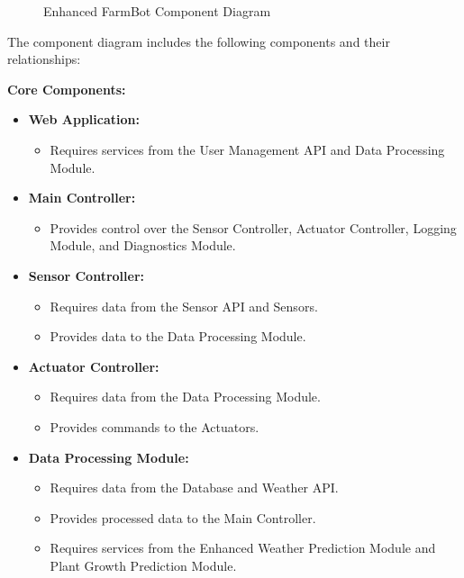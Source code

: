 \begin{figure}[H]
    \centering
    
    \caption{Enhanced FarmBot Component Diagram}
\end{figure}

The component diagram includes the following components and their relationships:

\textbf{Core Components:}
\begin{itemize}
    \item \textbf{Web Application:}
    \begin{itemize}
        \item Requires services from the User Management API and Data Processing Module.
    \end{itemize}

    \item \textbf{Main Controller:}
    \begin{itemize}
        \item Provides control over the Sensor Controller, Actuator Controller, Logging Module, and Diagnostics Module.
    \end{itemize}

    \item \textbf{Sensor Controller:}
    \begin{itemize}
        \item Requires data from the Sensor API and Sensors.
        \item Provides data to the Data Processing Module.
    \end{itemize}

    \item \textbf{Actuator Controller:}
    \begin{itemize}
        \item Requires data from the Data Processing Module.
        \item Provides commands to the Actuators.
    \end{itemize}

    \item \textbf{Data Processing Module:}
    \begin{itemize}
        \item Requires data from the Database and Weather API.
        \item Provides processed data to the Main Controller.
        \item Requires services from the Enhanced Weather Prediction Module and Plant Growth Prediction Module.
    \end{itemize}


\end{itemize}
